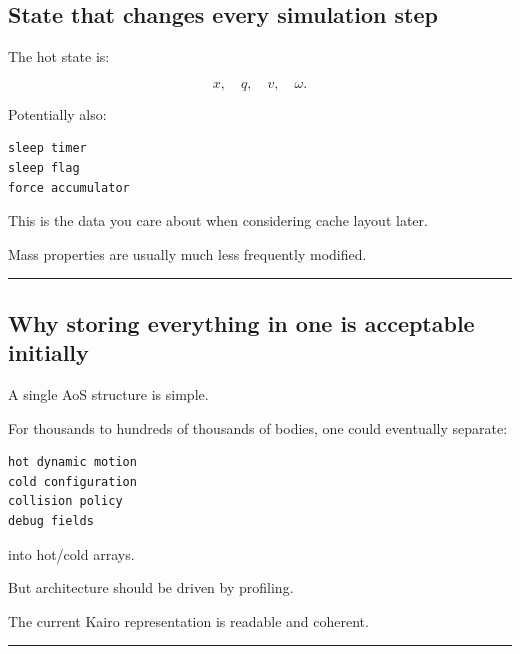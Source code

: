 \subsection{State that changes every simulation step}\label{06-engine-ii-ch037-state-that-changes-every-simulation-step}

\hypertarget{06-engine-ii-ch037-state-that-changes-every-simulation-step}{}

The hot state is:

\[
x,\quad q,\quad v,\quad\omega.
\]

Potentially also:

\begin{verbatim}
sleep timer
sleep flag
force accumulator
\end{verbatim}

This is the data you care about when considering cache layout later.

Mass properties are usually much less frequently modified.

\begin{center}\rule{0.5\linewidth}{0.5pt}\end{center}

\subsection{\texorpdfstring{Why storing everything in one  is acceptable initially}{Why storing everything in one RigidBody is acceptable initially}}\label{06-engine-ii-ch037-why-storing-everything-in-one-rigidbody-is-acceptable-initially}

\hypertarget{06-engine-ii-ch037-why-storing-everything-in-one-rigidbody-is-acceptable-initially}{}

A single AoS structure is simple.

For thousands to hundreds of thousands of bodies, one could eventually separate:

\begin{verbatim}
hot dynamic motion
cold configuration
collision policy
debug fields
\end{verbatim}

into hot/cold arrays.

But architecture should be driven by profiling.

The current Kairo representation is readable and coherent.

\begin{center}\rule{0.5\linewidth}{0.5pt}\end{center}

